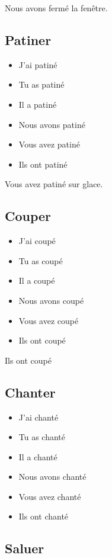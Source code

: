 Nous avons fermé la fenêtre.

\subsection{Patiner}

\begin{itemize}
    \item J'ai patiné 
    \item Tu as patiné 
    \item Il a patiné 
    \item Nous avons patiné 
    \item Vous avez patiné 
    \item Ils ont patiné
\end{itemize}

Vous avez patiné sur glace.

\subsection{Couper}

\begin{itemize}
    \item J'ai coupé
    \item Tu as coupé 
    \item Il a coupé 
    \item Nous avons coupé 
    \item Vous avez coupé
    \item Ils ont coupé
\end{itemize}

Ils ont coupé 

\subsection{Chanter}

\begin{itemize}
    \item J'ai chanté 
    \item Tu as chanté 
    \item Il a chanté 
    \item Nous avons chanté 
    \item Vous avez chanté
    \item Ils ont chanté
\end{itemize}

\subsection{Saluer}

